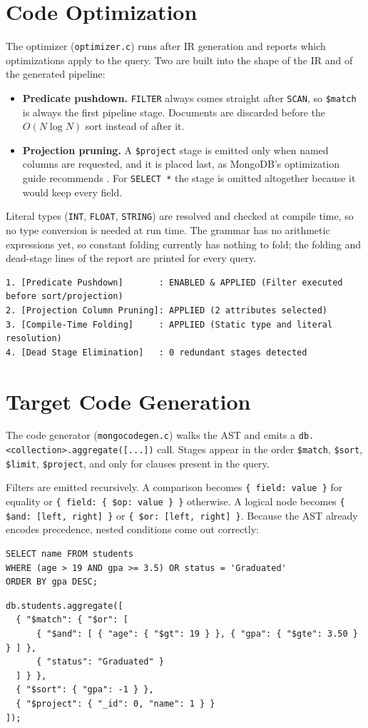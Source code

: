 \documentclass[12pt,a4paper]{report}
\newcommand{\codeus}{\textunderscore\allowbreak}
\DeclareRobustCommand{\code}[1]{\texttt{\let\_\codeus #1}}
\begin{document}
\section{Code Optimization}
The optimizer (\code{optimizer.c}) runs after IR generation and reports which optimizations apply to the query. Two are built into the shape of the IR and of the generated pipeline:
\begin{itemize}
  \item \textbf{Predicate pushdown.} \code{FILTER} always comes straight after \code{SCAN}, so \code{\$match} is always the first pipeline stage. Documents are discarded before the $O(N \log N)$ sort instead of after it.
  \item \textbf{Projection pruning.} A \code{\$project} stage is emitted only when named columns are requested, and it is placed last, as MongoDB's optimization guide recommends \cite{mongo-opt}. For \code{SELECT *} the stage is omitted altogether because it would keep every field.
\end{itemize}
Literal types (\code{INT}, \code{FLOAT}, \code{STRING}) are resolved and checked at compile time, so no type conversion is needed at run time. The grammar has no arithmetic expressions yet, so constant folding currently has nothing to fold; the folding and dead-stage lines of the report are printed for every query.
\begin{Verbatim}[fontsize=\scriptsize]
1. [Predicate Pushdown]       : ENABLED & APPLIED (Filter executed before sort/projection)
2. [Projection Column Pruning]: APPLIED (2 attributes selected)
3. [Compile-Time Folding]     : APPLIED (Static type and literal resolution)
4. [Dead Stage Elimination]   : 0 redundant stages detected
\end{Verbatim}

\section{Target Code Generation}
The code generator (\code{mongo\_codegen.c}) walks the AST and emits a \code{db.<collection>.\allowbreak aggregate([...])} call. Stages appear in the order \code{\$match}, \code{\$sort}, \code{\$limit}, \code{\$project}, and only for clauses present in the query.

Filters are emitted recursively. A comparison becomes \code{\{ field: value \}} for equality or \code{\{ field: \{ \$op: value \} \}} otherwise. A logical node becomes \code{\{ \$and: [left, right] \}} or \code{\{ \$or: [left, right] \}}. Because the AST already encodes precedence, nested conditions come out correctly:
\begin{lstlisting}
SELECT name FROM students
WHERE (age > 19 AND gpa >= 3.5) OR status = 'Graduated'
ORDER BY gpa DESC;
\end{lstlisting}
\begin{lstlisting}
db.students.aggregate([
  { "$match": { "$or": [
      { "$and": [ { "age": { "$gt": 19 } }, { "gpa": { "$gte": 3.50 } } ] },
      { "status": "Graduated" }
  ] } },
  { "$sort": { "gpa": -1 } },
  { "$project": { "_id": 0, "name": 1 } }
]);
\end{lstlisting}
\end{document}
